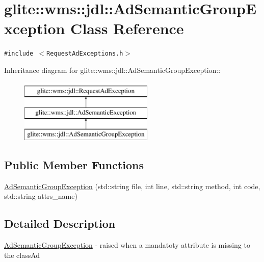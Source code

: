 \hypertarget{classglite_1_1wms_1_1jdl_1_1AdSemanticGroupException}{
\section{glite::wms::jdl::Ad\-Semantic\-Group\-Exception Class Reference}
\label{classglite_1_1wms_1_1jdl_1_1AdSemanticGroupException}
}
{\tt \#include $<$Request\-Ad\-Exceptions.h$>$}

Inheritance diagram for glite::wms::jdl::Ad\-Semantic\-Group\-Exception::\begin{figure}[H]
\begin{center}
\leavevmode
\includegraphics[height=3cm]{classglite_1_1wms_1_1jdl_1_1AdSemanticGroupException}
\end{center}
\end{figure}
\subsection*{Public Member Functions}
\begin{CompactItemize}
\item 
\hyperlink{classglite_1_1wms_1_1jdl_1_1AdSemanticGroupException_a0}{Ad\-Semantic\-Group\-Exception} (std::string file, int line, std::string method, int code, std::string attrs\_\-name)
\end{CompactItemize}


\subsection{Detailed Description}
\hyperlink{classglite_1_1wms_1_1jdl_1_1AdSemanticGroupException}{Ad\-Semantic\-Group\-Exception} - raised when a mandatoty attribute is missing to the class\-Ad 




